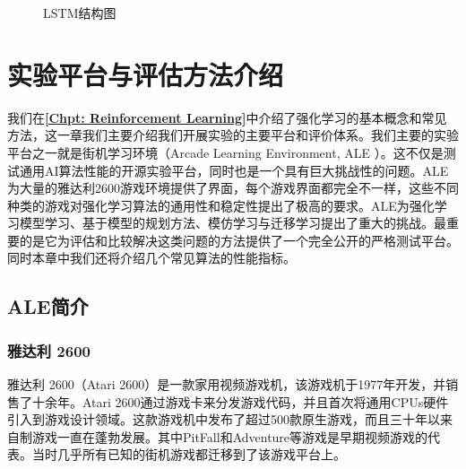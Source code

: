 \begin{figure}[!t]
	\caption{LSTM结构图}
\label{Fig: lstm}
\end{figure}





\chapter{实验平台与评估方法介绍}
\label{Chpt: experiment intro}

我们在\textbf{\ref{Chpt: Reinforcement Learning}}中介绍了强化学习的基本概念和常见方法，这一章我们主要介绍我们开展实验的主要平台和评价体系。我们主要的实验平台之一就是街机学习环境（Arcade Learning Environment, ALE ）。这不仅是测试通用AI算法性能的开源实验平台，同时也是一个具有巨大挑战性的问题。ALE为大量的雅达利2600游戏环境提供了界面，每个游戏界面都完全不一样，这些不同种类的游戏对强化学习算法的通用性和稳定性提出了极高的要求。ALE为强化学习模型学习、基于模型的规划方法、模仿学习与迁移学习提出了重大的挑战。最重要的是它为评估和比较解决这类问题的方法提供了一个完全公开的严格测试平台。同时本章中我们还将介绍几个常见算法的性能指标。

\section{ALE简介}
\subsection{雅达利 2600}
雅达利 2600（Atari 2600）是一款家用视频游戏机，该游戏机于1977年开发，并销售了十余年。Atari 2600通过游戏卡来分发游戏代码，并且首次将通用CPUs硬件引入到游戏设计领域。这款游戏机中发布了超过500款原生游戏，而且三十年以来自制游戏一直在蓬勃发展。其中PitFall和Adventure等游戏是早期视频游戏的代表。当时几乎所有已知的街机游戏都迁移到了该游戏平台上。

